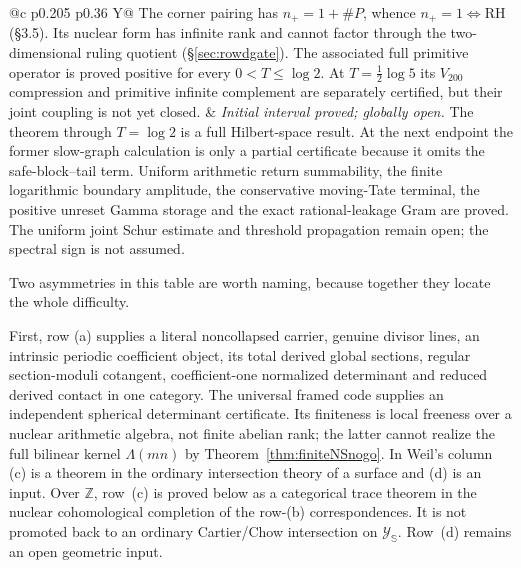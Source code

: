 \documentclass[11pt]{amsart}
\theoremstyle{definition}
\theoremstyle{remark}
\newcommand{\Z}{\mathbb Z}
\newcommand{\RH}{\mathrm{RH}}
\begin{document}
\begin{tabularx}{\textwidth}{@{}c p{} p{} Y@{}}
The corner pairing has $n_+=1+\#P$, whence $n_+=1\iff\RH$ (\S3.5).
Its nuclear form has infinite rank and cannot factor through the
two-dimensional ruling quotient
(\S\ref{sec:rowdgate}).  The associated full primitive operator is proved
positive for every $0<T\le\log2$.  At $T=\frac12\log5$ its $V_{200}$
compression and primitive infinite complement are separately certified,
but their joint coupling is not yet closed. &
\emph{Initial interval proved; globally open.}  The theorem through
$T=\log2$ is a full Hilbert-space result.  At the next endpoint the former
slow-graph calculation is only a partial certificate because it omits the
safe-block--tail term.  Uniform arithmetic return summability, the finite logarithmic boundary
amplitude, the conservative moving-Tate terminal, the positive unreset
Gamma storage and the exact rational-leakage Gram are proved.  The uniform
joint Schur estimate and threshold propagation remain open; the spectral
sign is not assumed.
 \\
\bottomrule
\end{tabularx}
\endgroup

\medskip

Two asymmetries in this table are worth naming, because together they
locate the whole difficulty.

First, row (a) supplies a literal noncollapsed carrier, genuine divisor
lines, an intrinsic periodic coefficient object, its total derived global
sections, regular section-moduli cotangent, coefficient-one normalized
determinant and reduced derived contact in one category.  The universal
framed code supplies an independent spherical determinant certificate.
Its finiteness is local
freeness over a nuclear arithmetic algebra, not finite abelian rank; the
latter cannot realize the full bilinear kernel $\Lambda(mn)$ by
Theorem~\ref{thm:finiteNSnogo}.  In Weil's column (c) is a theorem in the
ordinary intersection theory of a surface and (d) is an input.  Over $\Z$,
row~(c) is proved below as a categorical trace theorem in the nuclear
cohomological completion of the row-(b) correspondences.  It is not promoted
back to an ordinary Cartier/Chow intersection on $\mathscr Y_{\mathbb S}$.  Row~(d)
remains an open geometric input.
\end{document}
